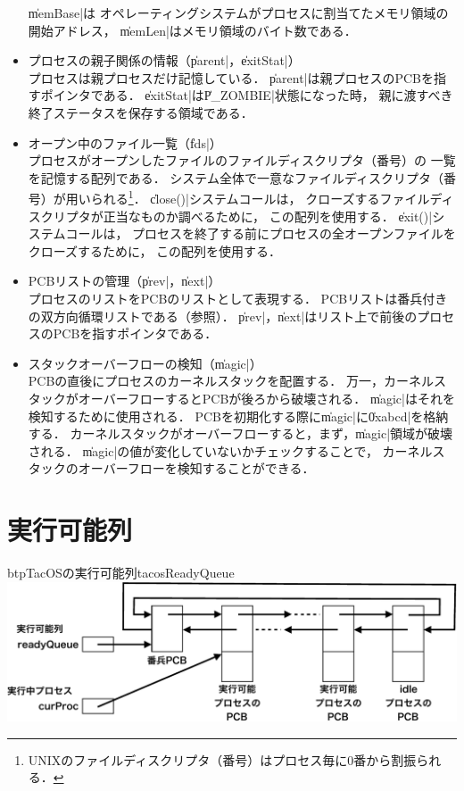 \begin{itemize}
  \|memBase|は
  オペレーティングシステムがプロセスに割当てたメモリ領域の開始アドレス，
  \|memLen|はメモリ領域のバイト数である．
\item プロセスの親子関係の情報（\|parent|，\|exitStat|） \\
  プロセスは親プロセスだけ記憶している．
  \|parent|は親プロセスのPCBを指すポインタである．
  \|exitStat|は\|P_ZOMBIE|状態になった時，
  親に渡すべき終了ステータスを保存する領域である．
\item オープン中のファイル一覧（\|fds|） \\
  プロセスがオープンしたファイルのファイルディスクリプタ（番号）の
  一覧を記憶する配列である．
  システム全体で一意なファイルディスクリプタ（番号）が用いられる\footnote{
    UNIXのファイルディスクリプタ（番号）はプロセス毎に0番から割振られる．}．
  \|close()|システムコールは，
  クローズするファイルディスクリプタが正当なものか調べるために，
  この配列を使用する．
  \|exit()|システムコールは，
  プロセスを終了する前にプロセスの全オープンファイルをクローズするために，
  この配列を使用する．
\item PCBリストの管理（\|prev|，\|next|） \\
  プロセスのリストをPCBのリストとして表現する．
  PCBリストは番兵付きの双方向循環リストである（参照）．
  \|prev|，\|next|はリスト上で前後のプロセスのPCBを指すポインタである．
\item スタックオーバーフローの検知（\|magic|） \\
  PCBの直後にプロセスのカーネルスタックを配置する．
  万一，カーネルスタックがオーバーフローするとPCBが後ろから破壊される．
  \|magic|はそれを検知するために使用される．
  PCBを初期化する際に\|magic|に\|0xabcd|を格納する．
  カーネルスタックがオーバーフローすると，まず，\|magic|領域が破壊される．
  \|magic|の値が変化していないかチェックすることで，
  カーネルスタックのオーバーフローを検知することができる．
\end{itemize}

\section{実行可能列}

\begin{myfig}{btp}{TacOSの実行可能列}{tacosReadyQueue}
  \includegraphics[scale=0.6]{Fig/tacosReadyQueue-crop.pdf}
\end{myfig}

